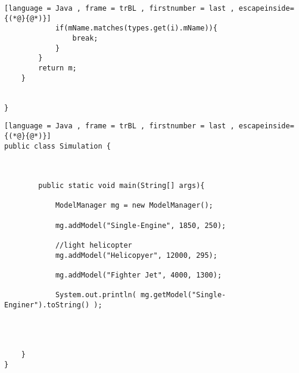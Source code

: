 \begin{enumerate}[label=(\alph*),align=left, wide, labelwidth=!, labelindent=0pt]
\begin{lstlisting}[language = Java , frame = trBL , firstnumber = last , escapeinside={(*@}{@*)}]
            if(mName.matches(types.get(i).mName)){
                break;
            }            
        }
        return m;
    }
    

}
\end{lstlisting}

\begin{lstlisting}[language = Java , frame = trBL , firstnumber = last , escapeinside={(*@}{@*)}]
public class Simulation {
    
    
    
        public static void main(String[] args){  
            
            ModelManager mg = new ModelManager();
            
            mg.addModel("Single-Engine", 1850, 250);
            
            //light helicopter
            mg.addModel("Helicopyer", 12000, 295);
            
            mg.addModel("Fighter Jet", 4000, 1300);
            
            System.out.println( mg.getModel("Single-Enginer").toString() );
            
            
            

    }
}


\end{lstlisting}

\end{enumerate}

